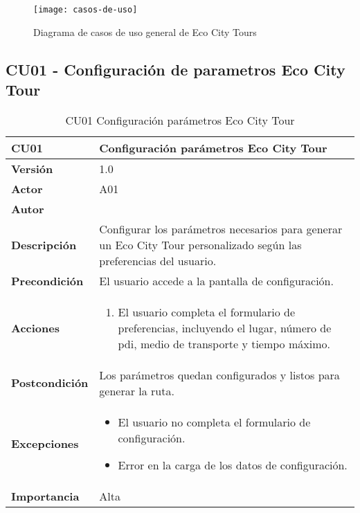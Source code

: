 \begin{figure}[H]
	\centering
	\texttt{[image: casos-de-uso]}
	\caption{Diagrama de casos de uso general de Eco City Tours}
	\label{fig:casos-de-uso}
\end{figure}


\subsection{CU01 - Configuración de parametros Eco City Tour}

\begin{table}[p]
	\centering
	\begin{tabularx}{\linewidth}{ p{} p{} }
		\toprule
		\textbf{CU01}    & \textbf{Configuración parámetros Eco City Tour} \\
		\toprule
		\textbf{Versión}              & 1.0    \\
		\textbf{Actor}                & A01 \\
		\textbf{Autor}                & \autor \\
		\textbf{Descripción}          & Configurar los parámetros necesarios para generar un Eco City Tour personalizado según las preferencias del usuario. \\
		\textbf{Precondición}         & El usuario accede a la pantalla de configuración. \\
		\textbf{Acciones}             &
		\begin{enumerate}
			\def\labelenumi{\arabic{enumi}.}
			\tightlist
			\item El usuario completa el formulario de preferencias, incluyendo el lugar, número de \acrshort{pdi}, medio de transporte y tiempo máximo.
		\end{enumerate}\\
		\textbf{Postcondición}        & Los parámetros quedan configurados y listos para generar la ruta. \\
		\textbf{Excepciones}          & 
		\begin{itemize}
			\tightlist
			\item El usuario no completa el formulario de configuración.
			\item Error en la carga de los datos de configuración.
		\end{itemize}\\
		\textbf{Importancia}          & Alta \\
		\bottomrule
	\end{tabularx}
	\caption{CU01 Configuración parámetros Eco City Tour}
\end{table}

